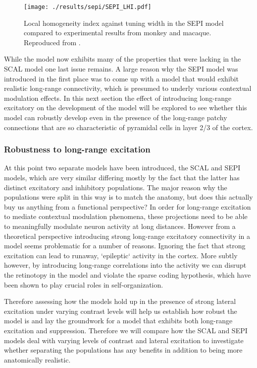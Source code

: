 \begin{figure}
	\centering
        \texttt{[image: ./results/sepi/SEPI\_LHI.pdf]}
	\caption{Local homogeneity index against tuning width in the SEPI
      model compared to experimental results from monkey and
      macaque. Reproduced from \cite{Nauhaus2008}.}
	\label{SEPILHI}
\end{figure}

While the model now exhibits many of the properties that were lacking
in the SCAL model one last issue remains. A large reason why the SEPI
model was introduced in the first place was to come up with a model
that would exhibit realistic long-range connectivity, which is
presumed to underly various contextual modulation effects. In this
next section the effect of introducing long-range excitatory on the
development of the model will be explored to see whether this model
can robustly develop even in the presence of the long-range patchy
connections that are so characteristic of pyramidal cells in layer 2/3
of the cortex.

\subsubsection{Robustness to long-range excitation}

At this point two separate models have been introduced, the SCAL and
SEPI models, which are very similar differing mostly by the fact that
the latter has distinct excitatory and inhibitory populations. The
major reason why the populations were split in this way is to match
the anatomy, but does this actually buy us anything from a functional
perspective? In order for long-range excitation to mediate contextual
modulation phenomena, these projections need to be able to
meaningfully modulate neuron activity at long distances. However from
a theoretical perspective introducing strong long-range excitatory
connectivity in a model seems problematic for a number of
reasons. Ignoring the fact that strong excitation can lead to runaway,
`epileptic` activity in the cortex. More subtly however, by
introducing long-range correlations into the activity we can disrupt
the retinotopy in the model and violate the sparse coding hypothesis,
which have been shown to play crucial roles in self-organization.

Therefore assessing how the models hold up in the presence of strong
lateral excitation under varying contrast levels will help us
establish how robust the model is and lay the groundwork for a model
that exhibits both long-range excitation and suppression. Therefore we
will compare how the SCAL and SEPI models deal with varying levels of
contrast and lateral excitation to investigate whether separating the
populations has any benefits in addition to being more anatomically
realistic.

